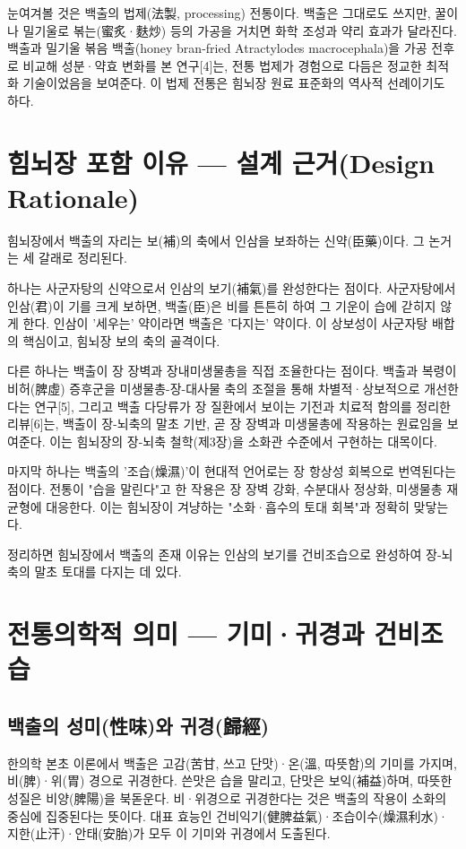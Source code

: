 \documentclass[12pt,oneside]{book}
\begin{document}
눈여겨볼 것은 백출의 법제(法製, processing) 전통이다. 백출은 그대로도 쓰지만, 꿀이나 밀기울로 볶는(蜜炙·麩炒) 등의 가공을 거치면 화학 조성과 약리 효과가 달라진다. 백출과 밀기울 볶음 백출(honey bran-fried Atractylodes macrocephala)을 가공 전후로 비교해 성분·약효 변화를 본 연구[4]는, 전통 법제가 경험으로 다듬은 정교한 최적화 기술이었음을 보여준다. 이 법제 전통은 힘뇌장 원료 표준화의 역사적 선례이기도 하다.

\section{힘뇌장 포함 이유 — 설계 근거(Design Rationale)}

힘뇌장에서 백출의 자리는 보(補)의 축에서 인삼을 보좌하는 신약(臣藥)이다. 그 논거는 세 갈래로 정리된다.

하나는 사군자탕의 신약으로서 인삼의 보기(補氣)를 완성한다는 점이다. 사군자탕에서 인삼(君)이 기를 크게 보하면, 백출(臣)은 비를 튼튼히 하여 그 기운이 습에 갇히지 않게 한다. 인삼이 '세우는' 약이라면 백출은 '다지는' 약이다. 이 상보성이 사군자탕 배합의 핵심이고, 힘뇌장 보의 축의 골격이다.

다른 하나는 백출이 장 장벽과 장내미생물총을 직접 조율한다는 점이다. 백출과 복령이 비허(脾虛) 증후군을 미생물총-장-대사물 축의 조절을 통해 차별적·상보적으로 개선한다는 연구[5], 그리고 백출 다당류가 장 질환에서 보이는 기전과 치료적 함의를 정리한 리뷰[6]는, 백출이 장-뇌축의 말초 기반, 곧 장 장벽과 미생물총에 작용하는 원료임을 보여준다. 이는 힘뇌장의 장-뇌축 철학(제3장)을 소화관 수준에서 구현하는 대목이다.

마지막 하나는 백출의 '조습(燥濕)'이 현대적 언어로는 장 항상성 회복으로 번역된다는 점이다. 전통이 "습을 말린다"고 한 작용은 장 장벽 강화, 수분대사 정상화, 미생물총 재균형에 대응한다. 이는 힘뇌장이 겨냥하는 "소화·흡수의 토대 회복"과 정확히 맞닿는다.

정리하면 힘뇌장에서 백출의 존재 이유는 인삼의 보기를 건비조습으로 완성하여 장-뇌축의 말초 토대를 다지는 데 있다.

\section{전통의학적 의미 — 기미·귀경과 건비조습}

\subsection{백출의 성미(性味)와 귀경(歸經)}

한의학 본초 이론에서 백출은 고감(苦甘, 쓰고 단맛)·온(溫, 따뜻함)의 기미를 가지며, 비(脾)·위(胃) 경으로 귀경한다. 쓴맛은 습을 말리고, 단맛은 보익(補益)하며, 따뜻한 성질은 비양(脾陽)을 북돋운다. 비·위경으로 귀경한다는 것은 백출의 작용이 소화의 중심에 집중된다는 뜻이다. 대표 효능인 건비익기(健脾益氣)·조습이수(燥濕利水)·지한(止汗)·안태(安胎)가 모두 이 기미와 귀경에서 도출된다.
\end{document}
